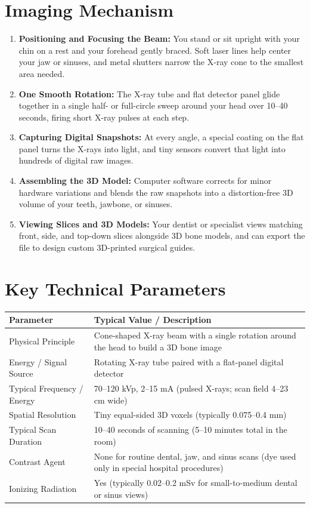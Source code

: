 \section{Imaging Mechanism}
\begin{enumerate}
    \item \textbf{Positioning and Focusing the Beam:} You stand or sit upright with your chin on a rest and your forehead gently braced. Soft laser lines help center your jaw or sinuses, and metal shutters narrow the X-ray cone to the smallest area needed.
    \item \textbf{One Smooth Rotation:} The X-ray tube and flat detector panel glide together in a single half- or full-circle sweep around your head over 10--40 seconds, firing short X-ray pulses at each step.
    \item \textbf{Capturing Digital Snapshots:} At every angle, a special coating on the flat panel turns the X-rays into light, and tiny sensors convert that light into hundreds of digital raw images.
    \item \textbf{Assembling the 3D Model:} Computer software corrects for minor hardware variations and blends the raw snapshots into a distortion-free 3D volume of your teeth, jawbone, or sinuses.
    \item \textbf{Viewing Slices and 3D Models:} Your dentist or specialist views matching front, side, and top-down slices alongside 3D bone models, and can export the file to design custom 3D-printed surgical guides.
\end{enumerate}

\section{Key Technical Parameters}
\noindent
\begin{tabularx}{\textwidth}{@{}l X@{}}
\toprule
\textbf{Parameter} & \textbf{Typical Value / Description} \\
\midrule
Physical Principle & Cone-shaped X-ray beam with a single rotation around the head to build a 3D bone image \\
Energy / Signal Source & Rotating X-ray tube paired with a flat-panel digital detector \\
Typical Frequency / Energy & 70--120 kVp, 2--15 mA (pulsed X-rays; scan field 4--23 cm wide) \\
Spatial Resolution & Tiny equal-sided 3D voxels (typically 0.075--0.4 mm) \\
Typical Scan Duration & 10--40 seconds of scanning (5--10 minutes total in the room) \\
Contrast Agent & None for routine dental, jaw, and sinus scans (dye used only in special hospital procedures) \\
Ionizing Radiation & Yes (typically 0.02--0.2 mSv for small-to-medium dental or sinus views) \\
\bottomrule
\end{tabularx}

